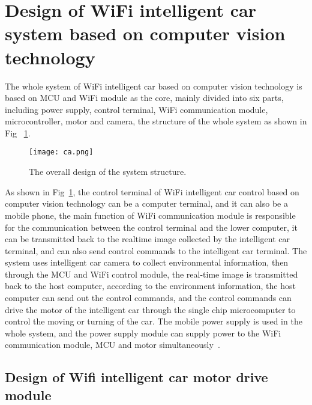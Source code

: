 \documentclass[10pt,twocolumn,letterpaper]{article}
\begin{document}
\section{Design of WiFi intelligent car system based on computer vision technology}

The whole system of WiFi intelligent car based on computer vision technology is based on MCU and WiFi module as the core, mainly divided into six parts, including power supply, control terminal, WiFi communication module, microcontroller, motor and camera, the structure of the whole system as shown in Fig ~\ref{1}.

\begin{figure}[!htb]
\centering
\texttt{[image: ca.png]}
\caption{The overall design of the system structure. }
\label{1}
\end{figure}

As shown in Fig~\ref{1}, the control terminal of WiFi intelligent car control based on computer vision technology can be a computer terminal, and it can also be a mobile phone, the main function of WiFi communication module is responsible for the communication between the control terminal and the lower computer, it can be transmitted back to the realtime image collected by the intelligent car terminal, and can also send control commands to the intelligent car terminal. The system uses intelligent car camera to collect environmental information, then through the MCU and WiFi control module, the real-time image is transmitted back to the host computer, according to the environment information, the host computer can send out the control commands, and the control commands can drive the motor of the intelligent car through the single chip microcomputer to control the moving or turning of the car. The mobile power supply is used in the whole system, and the power supply module can supply power to the WiFi communication module, MCU and motor simultaneously~\cite{Kong_2016_CVPR_Workshops}.





\subsection{Design of Wifi intelligent car motor drive module}
\par
\end{document}
